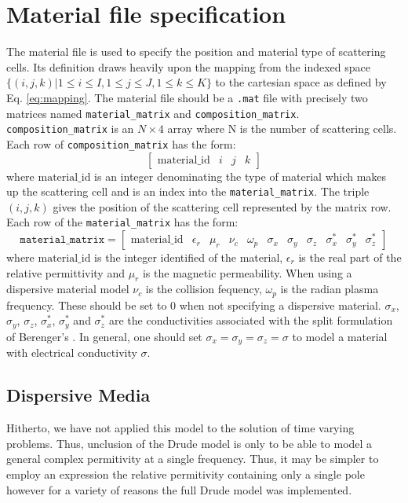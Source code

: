 \documentclass[a4paper, 12pt]{article}
\begin{document}
	\section{Material file specification}
	The material file is used to specify the position and material type of
	scattering cells. Its definition draws heavily upon the mapping from
	the indexed space $\{(i,j,k)|1\le i\le I,1\le j\le J,1\le k\le K\}$ to
	the cartesian space as defined by Eq. \ref{eq:mapping}. The material
	file should be a \verb+.mat+ file with precisely two matrices named
	\verb+material_matrix+ and
	\verb+composition_matrix+. \verb+composition_matrix+ is an $N\times 4$
	array where N is the number of scattering cells. Each row of
	\verb+composition_matrix+ has the form:
	\begin{equation}
		\left[\begin{array}{llll} \textrm{material\_id}&i&j&k \end{array}\right]
	\end{equation}
	where $\textrm{material\_id}$ is an integer  denominating the
	type of material which makes up the scattering cell and is an index
	into the \verb+material_matrix+. The triple $(i,j,k)$ gives the
	position of the scattering cell represented by the matrix row. Each
	row of the \verb+material_matrix+ has the form:
	\begin{equation}
		\texttt{material\_matrix}=\left[\begin{array}{lllllllllll}\textrm{material\_id}
			& \epsilon_r & \mu_r & \nu_c & \omega_p & \sigma_x & \sigma_y &
			\sigma_z & \sigma_x^* & \sigma_y^* &
			\sigma_z^* \end{array}\right]
	\end{equation}
	where $\textrm{material\_id}$ is the integer identified of the
	material, $\epsilon_r$ is the real part of the relative permittivity and
	$\mu_r$ is the magnetic permeability. When using a dispersive material
	model $\nu_c$ is the collision
	fequency, $\omega_p$ is the radian plasma frequency. These should be
	set to 0 when not specifying a dispersive material. $\sigma_x$,
	$\sigma_y$, $\sigma_z$, $\sigma_x^*$, $\sigma_y^*$ and $\sigma_z^*$
	are the conductivities associated with the split formulation of
	Berenger's \cite{taflove00book}. In general, one should set
	$\sigma_x=\sigma_y=\sigma_z=\sigma$ to model a material with
	electrical conductivity $\sigma$.
	\subsection{Dispersive Media}\label{sec:drude}
	Hitherto, we have not applied this model to the solution of time
	varying problems. Thus, unclusion of the Drude model is only to be
	able to model a general complex permitivity at a single
	frequency. Thus, it may be simpler to employ an expression the
	relative permitivity containing only a single pole however for a
	variety of reasons the full Drude model was implemented.
	
\end{document}
